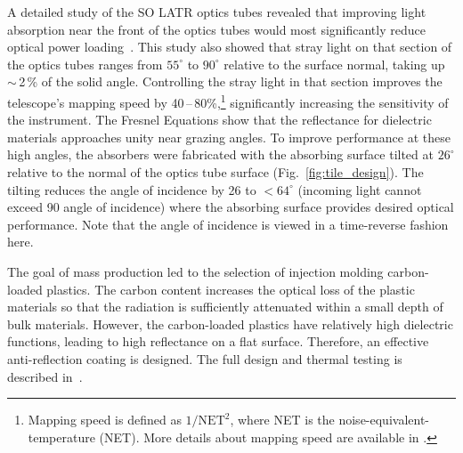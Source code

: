 A detailed study of the SO LATR optics tubes revealed that improving light absorption near the front of the optics tubes would most significantly reduce optical power loading~\cite{Gudmundsson:21}. This study also showed that stray light on that section of the optics tubes ranges from $55^\circ$ to $90^\circ$ relative to the surface normal, taking up $\sim$\,2\,\% of the solid angle. Controlling the stray light in that section improves the telescope's mapping speed by 40\,--\,80\%,\footnote{Mapping speed is defined as $1/\textrm{NET}^2$, where NET is the noise-equivalent-temperature (NET). More details about mapping speed are available in \cite{hill/etal:2018}.} significantly increasing the sensitivity of the instrument. The Fresnel Equations show that the reflectance for dielectric materials approaches unity near grazing angles.  To improve performance at these high angles, the absorbers were fabricated with the absorbing surface tilted at $26^\circ$ relative to the normal of the optics tube surface (Fig.~\ref{fig:tile_design}). The tilting reduces the angle of incidence by 26\dg{} to $<64^\circ$ (incoming light cannot exceed 90\dg{} angle of incidence) where the absorbing surface provides desired optical performance. Note that the angle of incidence is viewed in a time-reverse fashion here.

The goal of mass production led to the selection of injection molding carbon-loaded plastics. The carbon content increases the optical loss of the plastic materials so that the radiation is sufficiently attenuated within a small depth of bulk materials. However, the carbon-loaded plastics have relatively high dielectric functions, leading to high reflectance on a flat surface. Therefore, an effective anti-reflection coating is designed.  The full design and thermal testing is described in~\cite{Xu_2021}.

